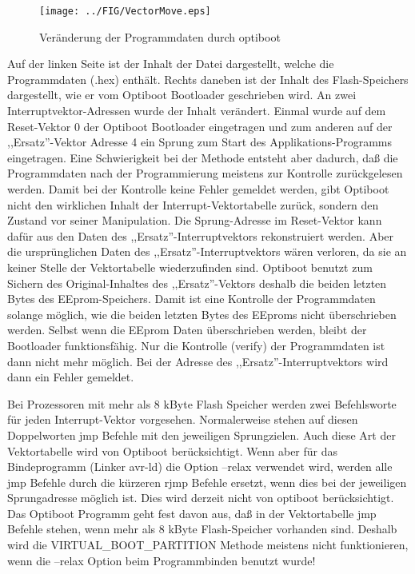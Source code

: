 \begin{figure}[H]
\centering
\texttt{[image: ../FIG/VectorMove.eps]}
\caption{Veränderung der Programmdaten durch optiboot}
\label{fig:VectorMove}
\end{figure}

Auf der linken Seite ist der Inhalt der Datei dargestellt, welche die Programmdaten (.hex) enthält.
Rechts daneben ist der Inhalt des Flash-Speichers dargestellt, wie er vom Optiboot Bootloader
geschrieben wird. An zwei Interruptvektor-Adressen wurde der Inhalt verändert.
Einmal wurde auf dem Reset-Vektor 0 der Optiboot Bootloader eingetragen und zum anderen
auf der ,,Ersatz''-Vektor Adresse 4 ein Sprung zum Start des Applikations-Programms eingetragen. 
Eine Schwierigkeit bei der Methode entsteht aber dadurch, daß die Programmdaten nach
der Programmierung meistens zur Kontrolle zurückgelesen werden.
Damit bei der Kontrolle keine Fehler gemeldet werden, gibt Optiboot nicht den wirklichen Inhalt
der Interrupt-Vektortabelle zurück, sondern den Zustand vor seiner Manipulation.
Die Sprung-Adresse im Reset-Vektor kann dafür aus den Daten des ,,Ersatz''-Interruptvektors rekonstruiert werden.
Aber die ursprünglichen Daten des ,,Ersatz''-Interruptvektors wären verloren, da sie an keiner
Stelle der Vektortabelle wiederzufinden sind.
Optiboot benutzt zum Sichern des Original-Inhaltes des ,,Ersatz''-Vektors deshalb die beiden letzten
Bytes des EEprom-Speichers.
Damit ist eine Kontrolle der Programmdaten solange möglich, wie die beiden letzten Bytes
des EEproms nicht überschrieben werden.
Selbst wenn die EEprom Daten überschrieben werden, bleibt der Bootloader funktionsfähig.
Nur die Kontrolle (verify) der Programmdaten ist dann nicht mehr möglich. Bei der Adresse
des ,,Ersatz''-Interruptvektors wird dann ein Fehler gemeldet.

Bei Prozessoren mit mehr als 8 kByte Flash Speicher werden zwei Befehlsworte für jeden Interrupt-Vektor
vorgesehen. Normalerweise stehen auf diesen Doppelworten jmp Befehle mit den jeweiligen Sprungzielen.
Auch diese Art der Vektortabelle wird von Optiboot berücksichtigt. Wenn aber für das Bindeprogramm
(Linker avr-ld) die Option --relax verwendet wird,
werden alle jmp Befehle durch die kürzeren rjmp Befehle ersetzt,
wenn dies bei der jeweiligen Sprungadresse möglich ist.
Dies wird derzeit nicht von optiboot berücksichtigt.
Das Optiboot Programm geht fest davon aus, daß in der Vektortabelle jmp Befehle stehen,
wenn mehr als 8 kByte Flash-Speicher vorhanden sind.
Deshalb wird die VIRTUAL\_BOOT\_PARTITION Methode meistens nicht funktionieren, wenn die --relax Option
beim Programmbinden benutzt wurde!


